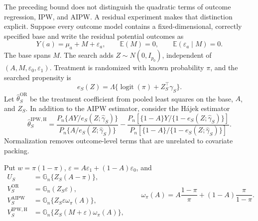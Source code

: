 \documentclass[a4paper,10pt,english]{article}
\newcommand{\E}{\mathbb E}
\begin{document}
The preceding bound does not distinguish the quadratic terms of outcome
regression, IPW, and AIPW.  A residual experiment makes that distinction
explicit.  Suppose every outcome model contains a fixed-dimensional,
correctly specified base and write the residual potential outcomes as
\begin{equation}\label{eq:residual-outcomes}
 Y(a)=\mu_a+M+\varepsilon_a,
 \qquad
 \E(M)=0,
 \qquad
 \E(\varepsilon_a\mid M)=0.
\end{equation}
The base spans $M$.  The search adds
$Z\sim N(0,I_{p_0})$, independent of
$(A,M,\varepsilon_0,\varepsilon_1)$.  Treatment is randomized with known
probability $\pi$, and the searched propensity is
\begin{equation*}
 e_S(Z)=\Lambda\{\operatorname{logit}(\pi)+Z_S^\top\gamma_S\}.
\end{equation*}
Let $\hat\theta_S^{\mathrm{OR}}$ be the treatment coefficient from pooled
least squares on the base, $A$, and $Z_S$.  In addition to the AIPW
estimator, consider the H\'ajek estimator
\begin{equation}\label{eq:hajek-ipw}
 \hat\theta_S^{\mathrm{IPW,H}}
 =\frac{P_n\{AY/e_S(Z;\hat\gamma_S)\}}
        {P_n\{A/e_S(Z;\hat\gamma_S)\}}
 -\frac{P_n[\{1-A\}Y/\{1-e_S(Z;\hat\gamma_S)\}]}
        {P_n[\{1-A\}/\{1-e_S(Z;\hat\gamma_S)\}]}.
\end{equation}
Normalization removes outcome-level terms that are unrelated to covariate
packing.

Put $w=\pi(1-\pi)$,
$\varepsilon=A\varepsilon_1+(1-A)\varepsilon_0$, and
\begin{equation}\label{eq:residual-packing-scores}
\begin{split}
 U_S&=\mathbb G_n\{Z_S(A-\pi)\},\\
 V_S^{\mathrm{OR}}&=\mathbb G_n(Z_S\varepsilon),\\
 V_S^{\mathrm{AIPW}}&=\mathbb G_n\{Z_S\varepsilon\omega_\pi(A)\},\\
 V_S^{\mathrm{IPW,H}}&=\mathbb G_n\{Z_S(M+\varepsilon)\omega_\pi(A)\},
\end{split}
\qquad
 \omega_\pi(A)=A\frac{1-\pi}{\pi}
 +(1-A)\frac{\pi}{1-\pi}.
\end{equation}
\end{document}
